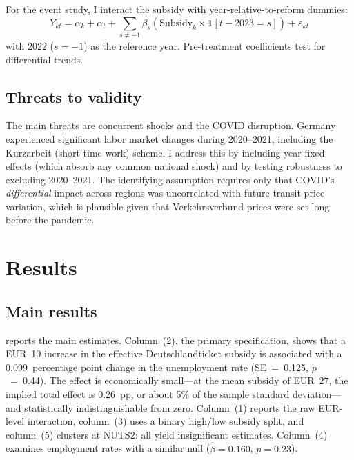 \documentclass[12pt]{article}
\begin{document}
For the event study, I interact the subsidy with year-relative-to-reform dummies:
\begin{equation}
Y_{kt} = \alpha_k + \alpha_t + \sum_{s \neq -1} \beta_s \left(\text{Subsidy}_k \times \mathbf{1}[t - 2023 = s]\right) + \varepsilon_{kt}
\end{equation}
with 2022 ($s = -1$) as the reference year. Pre-treatment coefficients test for differential trends.

\subsection{Threats to validity}

The main threats are concurrent shocks and the COVID disruption. Germany experienced significant labor market changes during 2020--2021, including the Kurzarbeit (short-time work) scheme. I address this by including year fixed effects (which absorb any common national shock) and by testing robustness to excluding 2020--2021. The identifying assumption requires only that COVID's \textit{differential} impact across regions was uncorrelated with future transit price variation, which is plausible given that Verkehrsverbund prices were set long before the pandemic.


\section{Results}
\label{sec:results}

\subsection{Main results}

 reports the main estimates. Column~(2), the primary specification, shows that a EUR~10 increase in the effective Deutschlandticket subsidy is associated with a 0.099~percentage point change in the unemployment rate (SE~=~0.125, $p$~=~0.44). The effect is economically small---at the mean subsidy of EUR~27, the implied total effect is 0.26~pp, or about 5\% of the sample standard deviation---and statistically indistinguishable from zero. Column~(1) reports the raw EUR-level interaction, column~(3) uses a binary high/low subsidy split, and column~(5) clusters at NUTS2: all yield insignificant estimates. Column~(4) examines employment rates with a similar null ($\hat{\beta}=0.160$, $p=0.23$).


\end{document}
